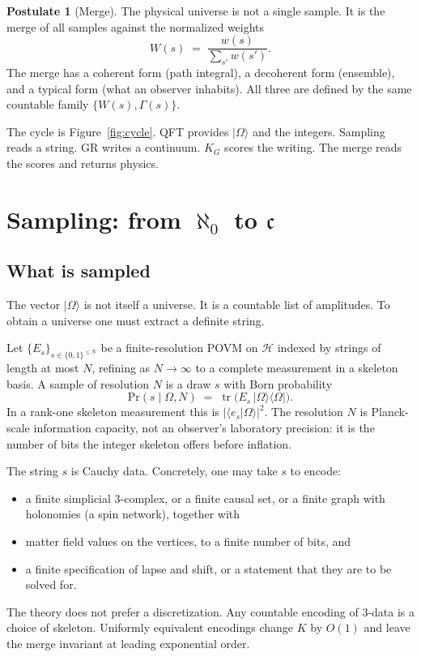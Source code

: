 \documentclass[11pt,a4paper]{article}
\theoremstyle{plain}
\theoremstyle{definition}
\newtheorem{postulate}{Postulate}
\theoremstyle{remark}
\newcommand{\alef}{\aleph_{0}}
\newcommand{\cont}{\mathfrak{c}}
\newcommand{\Hil}{\mathcal{H}}
\newcommand{\KG}{K_{G}}
\newcommand{\abs}[1]{\lvert#1\rvert}
\newcommand{\ket}[1]{\lvert#1\rangle}
\newcommand{\bra}[1]{\langle#1\rvert}
\newcommand{\braket}[2]{\langle#1|#2\rangle}
\newcommand{\tr}{\operatorname{tr}}
\begin{document}
\begin{postulate}[Merge]
\label{post:merge}
The physical universe is not a single sample.
It is the merge of all samples against the normalized weights
\begin{equation}
  W(s) \;=\; \frac{w(s)}{\sum_{s'} w(s')}.
  \label{eq:W}
\end{equation}
The merge has a coherent form (path integral), a decoherent form (ensemble), and a typical form (what an observer inhabits).
All three are defined by the same countable family $\{W(s),\Gamma(s)\}$.
\end{postulate}

The cycle is Figure~\ref{fig:cycle}.
QFT provides $\ket{\Omega}$ and the integers.
Sampling reads a string.
GR writes a continuum.
$\KG$ scores the writing.
The merge reads the scores and returns physics.

\section{\texorpdfstring{Sampling: from $\alef$ to $\cont$}{Sampling: from aleph\_0 to the continuum}}
\label{sec:sampling}

\subsection{What is sampled}

The vector $\ket{\Omega}$ is not itself a universe.
It is a countable list of amplitudes.
To obtain a universe one must extract a definite string.

Let $\{E_{s}\}_{s\in\{0,1\}^{\le N}}$ be a finite-resolution POVM on $\Hil$ indexed by strings of length at most $N$, refining as $N\to\infty$ to a complete measurement in a skeleton basis.
A sample of resolution $N$ is a draw $s$ with Born probability
\begin{equation}
  \mathrm{Pr}(s\mid\Omega,N) \;=\; \tr\bigl(E_{s}\,\ket{\Omega}\bra{\Omega}\bigr).
\end{equation}
In a rank-one skeleton measurement this is $\abs{\braket{e_{s}}{\Omega}}^{2}$.
The resolution $N$ is Planck-scale information capacity, not an observer's laboratory precision: it is the number of bits the integer skeleton offers before inflation.

The string $s$ is Cauchy data.
Concretely, one may take $s$ to encode:
\begin{itemize}
  \item a finite simplicial $3$-complex, or a finite causal set, or a finite graph with holonomies (a spin network), together with
  \item matter field values on the vertices, to a finite number of bits, and
  \item a finite specification of lapse and shift, or a statement that they are to be solved for.
\end{itemize}
The theory does not prefer a discretization.
Any countable encoding of $3$-data is a choice of skeleton.
Uniformly equivalent encodings change $K$ by $O(1)$ and leave the merge invariant at leading exponential order.
\end{document}
